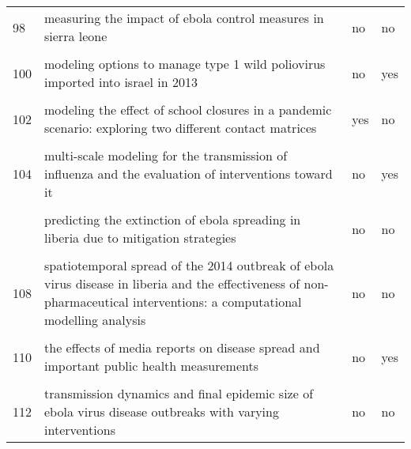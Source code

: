 \documentclass[
]{article}
\begin{document}
\begin{landscape}
\begin{longtable}{l>{\raggedright\arraybackslash}p{4cm}l>{\raggedright\arraybackslash}p{4cm}}
98 & measuring the impact of ebola control measures in sierra leone & no & no\\
\cellcolor{gray!6}{99} & \cellcolor{gray!6}{media impact switching surface during an infectious disease outbreak} & \cellcolor{gray!6}{no} & \cellcolor{gray!6}{no}\\
100 & modeling options to manage type 1 wild poliovirus imported into israel in 2013 & no & yes\\
\addlinespace
\cellcolor{gray!6}{101} & \cellcolor{gray!6}{modeling the effect of comprehensive interventions on ebola virus transmission} & \cellcolor{gray!6}{no} & \cellcolor{gray!6}{yes}\\
102 & modeling the effect of school closures in a pandemic scenario: exploring two different contact matrices & yes & no\\
\cellcolor{gray!6}{103} & \cellcolor{gray!6}{modelling the effect of early detection of ebola} & \cellcolor{gray!6}{no} & \cellcolor{gray!6}{no}\\
104 & multi-scale modeling for the transmission of influenza and the evaluation of interventions toward it & no & yes\\
\cellcolor{gray!6}{105} & \cellcolor{gray!6}{optimal intervention strategies for a seir control model of ebola epidemics} & \cellcolor{gray!6}{no} & \cellcolor{gray!6}{no}\\
\addlinespace
106 & predicting the extinction of ebola spreading in liberia due to mitigation strategies & no & no\\
\cellcolor{gray!6}{107} & \cellcolor{gray!6}{school closure strategies for the 2009 hong kong hini influenza pandemic} & \cellcolor{gray!6}{no} & \cellcolor{gray!6}{no}\\
108 & spatiotemporal spread of the 2014 outbreak of ebola virus disease in liberia and the effectiveness of non-pharmaceutical interventions: a computational modelling analysis & no & no\\
\cellcolor{gray!6}{109} & \cellcolor{gray!6}{strategies for early vaccination during novel influenza outbreaks} & \cellcolor{gray!6}{no} & \cellcolor{gray!6}{yes}\\
110 & the effects of media reports on disease spread and important public health measurements & no & yes\\
\addlinespace
\cellcolor{gray!6}{111} & \cellcolor{gray!6}{the impact of human behavioral changes in 2014 west africa ebola outbreak} & \cellcolor{gray!6}{no} & \cellcolor{gray!6}{no}\\
112 & transmission dynamics and final epidemic size of ebola virus disease outbreaks with varying interventions & no & no\\

\end{longtable}
\end{landscape}
\end{document}
